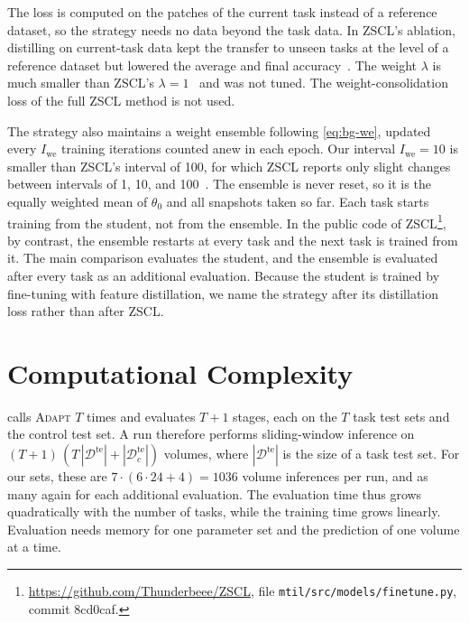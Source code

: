 The loss is computed on the patches of the current task instead of a reference dataset, so the strategy needs no data beyond the task data.
In ZSCL's ablation, distilling on current-task data kept the transfer to unseen tasks at the level of a reference dataset but lowered the average and final accuracy~\cite[Table~1b]{zheng2023preventingzeroshottransferdegradation}.
The weight $\lambda$ is much smaller than ZSCL's $\lambda = 1$~\cite[App.~B]{zheng2023preventingzeroshottransferdegradation} and was not tuned.
The weight-consolidation loss of the full ZSCL method is not used.

The strategy also maintains a weight ensemble following \cref{eq:bg-we}, updated every $I_{\mathrm{we}}$ training iterations counted anew in each epoch.
Our interval $I_{\mathrm{we}} = 10$ is smaller than ZSCL's interval of 100, for which ZSCL reports only slight changes between intervals of 1, 10, and 100~\cite[App.~B]{zheng2023preventingzeroshottransferdegradation}.
The ensemble is never reset, so it is the equally weighted mean of $\theta_0$ and all snapshots taken so far.
Each task starts training from the student, not from the ensemble.
In the public code of ZSCL\footnote{\url{https://github.com/Thunderbeee/ZSCL}, file \texttt{mtil/src/models/finetune.py}, commit 8cd0caf.}, by contrast, the ensemble restarts at every task and the next task is trained from it.
The main comparison evaluates the student, and the ensemble is evaluated after every task as an additional evaluation.
Because the student is trained by fine-tuning with feature distillation, we name the strategy after its distillation loss rather than after ZSCL.

\section{Computational Complexity}
\label{sec:method-complexity}

 calls \textsc{Adapt} $T$ times and evaluates $T+1$ stages, each on the $T$ task test sets and the control test set.
A run therefore performs sliding-window inference on $(T+1)\,(T\,|\mathcal{D}^{\mathrm{te}}| + |\mathcal{D}_c^{\mathrm{te}}|)$ volumes, where $|\mathcal{D}^{\mathrm{te}}|$ is the size of a task test set.
For our sets, these are $7 \cdot (6 \cdot 24 + 4) = 1036$ volume inferences per run, and as many again for each additional evaluation.
The evaluation time thus grows quadratically with the number of tasks, while the training time grows linearly.
Evaluation needs memory for one parameter set and the prediction of one volume at a time.

